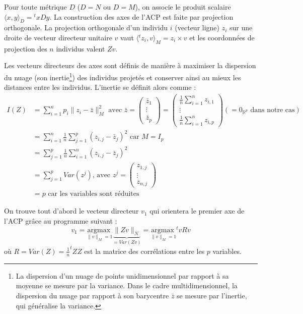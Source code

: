 \documentclass[11pt,french,french]{article}
\let\rmarkdownfootnote\footnote%
\def\footnote{\protect\rmarkdownfootnote}
\begin{document}
Pour toute métrique \(D\) (\(D=N\) ou \(D=M\)), on associe le produit scalaire \(\langle x,y\rangle_{D} = {}^t\!xD y\).
La construction des axes de l'ACP est faite par projection orthogonale.
La projection orthogonale d'un individu \(i\) (vecteur ligne) \(z_i\) sur une droite de vecteur directeur unitaire \(v\) vaut \(\langle {}^tz_i,v\rangle_{M}=z_i\times v\) et les coordonnées de projection des \(n\) individus valent \(Zv\).

Les vecteurs directeurs des axes sont définis de manière à maximiser la dispersion du nuage (son inertie\footnote{La dispersion d'un nuage de points unidimensionnel par rapport à sa moyenne se mesure par la variance.
  Dans le cadre multidimensionnel, la dispersion du nuage par rapport à son barycentre \(\bar z\) se mesure par l'inertie, qui généralise la variance.}) des individus projetés et conserver ainsi au mieux les distances entre les individus. L'inertie se définit alors comme :
\begin{align*}
I(Z) &= \sum_{i = 1}^n p_i\|z_i-\bar{z}\|_M^2 \text{ avec }
  \bar{z} = 
  \begin{pmatrix}\bar z_{1} \\
    \vdots \\ \bar z_{p}
  \end{pmatrix} =
  \begin{pmatrix}\frac 1 n \sum_{i=1}^n z_{i,1} \\
    \vdots \\ \frac 1 n \sum_{i=1}^n z_{i,p}
  \end{pmatrix} (= 0_{\mathbb R^p}\text{ dans notre cas})
\\&=\sum_{i = 1}^n \frac 1 n \sum_{j=1}^p (z_{i,j} -  \bar{z}_j)^2  \text{ car }M=I_p 
\\&=\sum_{j = 1}^p \frac 1 n \sum_{i=1}^n (z_{i,j} -  \bar{z}_j)^2
\\&=\sum_{j = 1}^p Var(z^j)\text{, avec } z^j = 
  \begin{pmatrix} z_{1,j} \\ \vdots \\  z_{n,j} 
  \end{pmatrix}
\\ &= p \text{ car les variables sont réduites}
\end{align*}

On trouve tout d'abord le vecteur directeur \(v_1\) qui orientera le premier axe de l'ACP grâce au programme suivant :
\[
v_1 =\underset{\| v \|_M = 1}{\mathrm{argmax~}} 
\underbrace{\|Zv\|_N}_{=Var(Zv)} =\underset{\| v \|_M = 1}{\mathrm{argmax~}} ^t\!vR v 
\]
où \(R = Var(Z) = \frac{1}{n} ^t\!Z Z\) est la matrice des corrélations entre les \(p\) variables.
\end{document}
